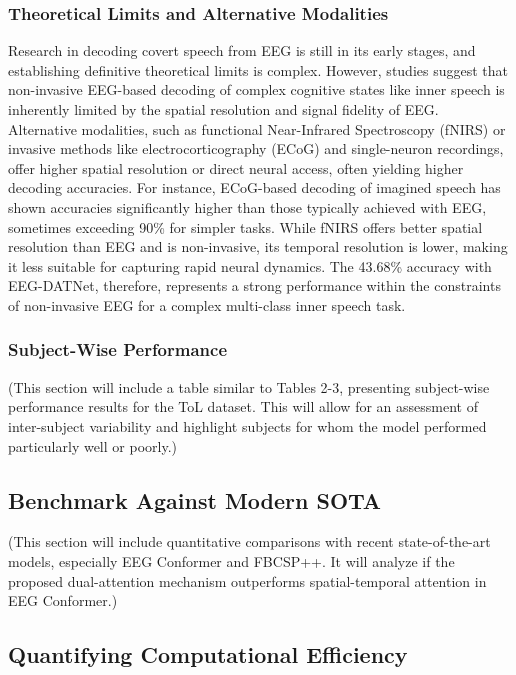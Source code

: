 \documentclass[pdflatex,sn-mathphys-num]{sn-jnl}
\theoremstyle{thmstyleone}%
\theoremstyle{thmstyletwo}%
\theoremstyle{thmstylethree}%
\begin{document}
\subsubsection{Theoretical Limits and Alternative Modalities}

Research in decoding covert speech from EEG is still in its early stages, and establishing definitive theoretical limits is complex. However, studies suggest that non-invasive EEG-based decoding of complex cognitive states like inner speech is inherently limited by the spatial resolution and signal fidelity of EEG. Alternative modalities, such as functional Near-Infrared Spectroscopy (fNIRS) or invasive methods like electrocorticography (ECoG) and single-neuron recordings, offer higher spatial resolution or direct neural access, often yielding higher decoding accuracies. For instance, ECoG-based decoding of imagined speech has shown accuracies significantly higher than those typically achieved with EEG, sometimes exceeding 90\% for simpler tasks. While fNIRS offers better spatial resolution than EEG and is non-invasive, its temporal resolution is lower, making it less suitable for capturing rapid neural dynamics. The 43.68\% accuracy with EEG-DATNet, therefore, represents a strong performance within the constraints of non-invasive EEG for a complex multi-class inner speech task.

\subsubsection{Subject-Wise Performance}

(This section will include a table similar to Tables 2-3, presenting subject-wise performance results for the ToL dataset. This will allow for an assessment of inter-subject variability and highlight subjects for whom the model performed particularly well or poorly.)

\subsection{Benchmark Against Modern SOTA}

(This section will include quantitative comparisons with recent state-of-the-art models, especially EEG Conformer and FBCSP++. It will analyze if the proposed dual-attention mechanism outperforms spatial-temporal attention in EEG Conformer.)

\subsection{Quantifying Computational Efficiency}
\end{document}
